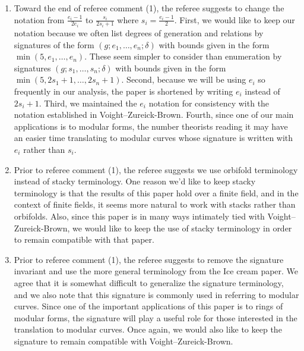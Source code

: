 \documentclass[10 pt]{amsart}
\theoremstyle{plain}
\theoremstyle{definition}
\theoremstyle{remark}
\numberwithin{equation}{section}
\begin{document}
\begin{enumerate}
	\item Toward the end of referee comment (1), the referee suggests
		to change the notation from $\frac{e_i - 1}{2 e_i}$
		to $\frac{s_i}{2 s_i + 1}$ where $s_i = \frac{e_i - 1}{2}$.
		First, we would like to keep our notation because we often
	list degrees of generation and relations by signatures
	of the form $(g; e_1, \ldots, e_n; \delta)$ with bounds given in
	the form $\min(5, e_1, \ldots, e_n)$. These
	seem simpler to
	consider than enumeration by signatures $(g; s_1, \ldots, s_n;
	\delta)$ with bounds given in the form $\min(5, 2s_1 + 1, \ldots,
	2s_n + 1)$. Second, because we will be using $e_i$
	so frequently in our analysis, the paper is shortened
	by writing $e_i$ instead of $2s_i+1$.
	Third, we maintained the $e_i$ notation for consistency
	with the notation established in Voight--Zureick-Brown.
	Fourth, since one of our main applications is to modular forms,
	the number theorists reading it may have an easier time translating
	to modular curves whose signature is written with $e_i$ rather than $s_i$.
	\item Prior to referee comment (1), the referee suggests we use orbifold terminology instead
		of stacky terminology. 
		One reason we'd like to keep stacky terminology is
		that the results of this paper hold over a finite field,
		and in the context of finite fields, it seems more natural to work with
		stacks rather than orbifolds.
		Also, since this paper is in many
		ways intimately tied with Voight--Zureick-Brown,
		we would like to keep the use of stacky terminology
		in order to remain compatible with that paper.
	\item Prior to referee comment (1), the referee suggests to remove the signature invariant
		and use the more general terminology from the
		Ice cream paper. We agree that it is
		somewhat difficult to generalize the
		signature terminology,
		and we also note that this signature is commonly used in referring
		to modular curves. Since one of the important
		applications of this paper is to rings of modular
		forms, the signature will play a useful role for
		those interested in the translation to modular curves.
		Once again, we would also like to keep the signature
		to remain compatible with Voight--Zureick-Brown.
\end{enumerate}
\end{document}
